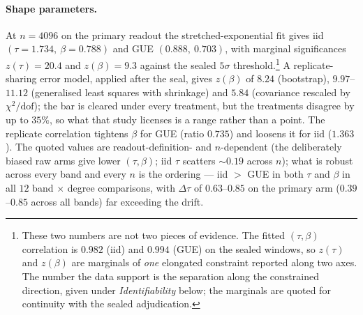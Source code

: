 \documentclass[11pt]{article}
\begin{document}
\paragraph{Shape parameters.} At $n=4096$ on the primary readout the stretched-exponential
fit gives iid $(\tau=1.734,\ \beta=0.788)$ and GUE $(0.888,\ 0.703)$, with marginal
significances $z(\tau)=20.4$ and $z(\beta)=9.3$ against the sealed $5\sigma$
threshold.\footnote{These two numbers are not two pieces of evidence. The fitted
$(\tau,\beta)$ correlation is $0.982$ (iid) and $0.994$ (GUE) on the sealed windows, so
$z(\tau)$ and $z(\beta)$ are marginals of \emph{one} elongated constraint reported along two
axes. The number the data support is the separation along the constrained direction, given
under \emph{Identifiability} below; the marginals are quoted for continuity with the sealed
adjudication.} A replicate-sharing error model, applied after the seal, gives $z(\beta)$ of
$8.24$ (bootstrap), $9.97$--$11.12$ (generalised least squares with shrinkage) and $5.84$
(covariance rescaled by $\chi^2/\mathrm{dof}$); the bar is cleared under every treatment, but
the treatments disagree by up to $35\%$, so what that study licenses is a range rather than a
point. The replicate correlation tightens $\beta$ for GUE (ratio $0.735$) and loosens it for
iid ($1.363$). The quoted values are readout-definition- and $n$-dependent (the deliberately biased raw
arms give lower $(\tau,\beta)$; iid $\tau$ scatters ${\sim}0.19$ across $n$); what is robust
across every band and every $n$ is the ordering --- iid $>$ GUE in both $\tau$ and $\beta$ in
all $12$ band $\times$ degree comparisons, with $\Delta\tau$ of $0.63$--$0.85$ on the primary
arm ($0.39$--$0.85$ across all bands) far exceeding the drift.
\end{document}
